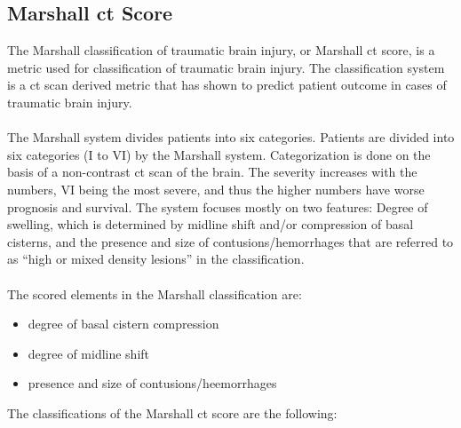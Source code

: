 \documentclass[11pt]{article}
\begin{document}
\subsection{Marshall \gls{ct} Score}
The Marshall classification of traumatic brain injury, or Marshall \gls{ct} score, is a metric used for classification of traumatic brain injury. The classification system is a \gls{ct} scan derived metric that has shown to predict patient outcome in cases of traumatic brain injury.\cite{gaillardMarshallClassificationTraumatic}\\
\\
The Marshall system divides patients into six categories.
Patients are divided into six categories (I to VI) by the Marshall system. Categorization is done on the basis of a non-contrast \gls{ct} scan of the brain. The severity increases with the numbers, VI being the most severe, and thus the higher numbers have worse prognosis and survival. The system focuses mostly on two features: Degree of swelling, which is determined by midline shift and/or compression of basal cisterns, and the presence and size of contusions/hemorrhages that are referred to as ``high or mixed density lesions'' in the classification.\cite{gaillardMarshallClassificationTraumatic}\\
\\
The scored elements in the Marshall classification are:

\begin{itemize}
\item{degree of basal cistern compression}
\item{degree of midline shift}
\item{presence and size of contusions/heemorrhages}
\end{itemize}

The classifications of the Marshall \gls{ct} score are the following:
\end{document}
